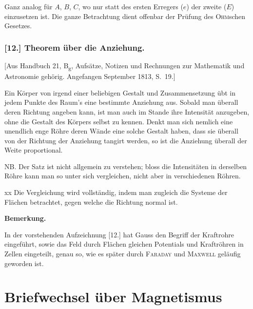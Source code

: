 \documentclass[12pt,a4paper]{article}
\begin{document}
Ganz analog f\"ur $A$, $B$, $C$, wo nur statt des ersten Erregers ($e$) der zweite ($E$) einzusetzen ist. Die ganze Betrachtung dient offenbar der Pr\"ufung des \textsc{Ohm}schen Gesetzes.

\subsubsection*{[12.] Theorem \"uber die Anziehung.}

[Aus Handbuch 21, B\textsubscript{g}, Aufs\"atze, Notizen und Rechnungen zur Mathematik und Astronomie geh\"orig. Angefangen September 1813, S.~19.]

Ein K\"orper von irgend einer beliebigen Gestalt und Zusammensetzung \"ubt in jedem Punkte des Raum's eine bestimmte Anziehung aus. Sobald man \"uberall deren Richtung angeben kann, ist man auch im Stande ihre Intensit\"at anzugeben, ohne die Gestalt des K\"orpers selbst zu kennen. Denkt man sich nemlich eine unendlich enge R\"ohre deren W\"ande eine solche Gestalt haben, dass sie \"uberall von der Richtung der Anziehung tangirt werden, so ist die Anziehung \"uberall der Weite proportional.

\medskip\noindent
NB. Der Satz ist nicht allgemein zu verstehen; bloss die Intensit\"aten in derselben R\"ohre kann man so unter sich vergleichen, nicht aber in verschiedenen R\"ohren.

\medskip\noindent
xx Die Vergleichung wird vollst\"andig, indem man zugleich die Systeme der Fl\"achen betrachtet, gegen welche die Richtung normal ist.

\medskip\noindent
\textbf{Bemerkung.}

In der vorstehenden Aufzeichnung [12.] hat Gauss den Begriff der Kraftrohre eingef\"uhrt, sowie das Feld durch Fl\"achen gleichen Potentials und Kraftr\"ohren in Zellen eingeteilt, genau so, wie es sp\"ater durch \textsc{Faraday} und \textsc{Maxwell} gel\"aufig geworden ist.


\newpage
\section*{Briefwechsel \"uber Magnetismus}

\end{document}
